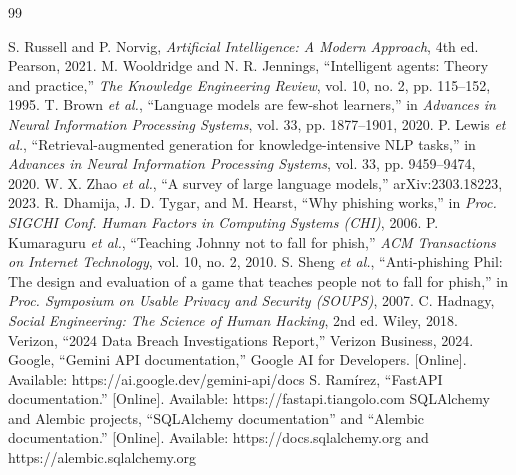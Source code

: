 \documentclass[conference,letterpaper]{IEEEtran}
\renewenvironment{thebibliography}[1]{%
  \begin{oldthebibliography}{#1}%
    \setlength{\itemsep}{0.5pt}%
    \setlength{\parskip}{0pt}%
}{%
  \end{oldthebibliography}%
}
\begin{document}
\begin{thebibliography}{99}
 S. Russell and P. Norvig, \textit{Artificial Intelligence: A Modern Approach}, 4th ed. Pearson, 2021.
 M. Wooldridge and N. R. Jennings, ``Intelligent agents: Theory and practice,'' \textit{The Knowledge Engineering Review}, vol. 10, no. 2, pp. 115--152, 1995.
 T. Brown \textit{et al.}, ``Language models are few-shot learners,'' in \textit{Advances in Neural Information Processing Systems}, vol. 33, pp. 1877--1901, 2020.
 P. Lewis \textit{et al.}, ``Retrieval-augmented generation for knowledge-intensive NLP tasks,'' in \textit{Advances in Neural Information Processing Systems}, vol. 33, pp. 9459--9474, 2020.
 W. X. Zhao \textit{et al.}, ``A survey of large language models,'' arXiv:2303.18223, 2023.
 R. Dhamija, J. D. Tygar, and M. Hearst, ``Why phishing works,'' in \textit{Proc. SIGCHI Conf. Human Factors in Computing Systems (CHI)}, 2006.
 P. Kumaraguru \textit{et al.}, ``Teaching Johnny not to fall for phish,'' \textit{ACM Transactions on Internet Technology}, vol. 10, no. 2, 2010.
 S. Sheng \textit{et al.}, ``Anti-phishing Phil: The design and evaluation of a game that teaches people not to fall for phish,'' in \textit{Proc. Symposium on Usable Privacy and Security (SOUPS)}, 2007.
 C. Hadnagy, \textit{Social Engineering: The Science of Human Hacking}, 2nd ed. Wiley, 2018.
 Verizon, ``2024 Data Breach Investigations Report,'' Verizon Business, 2024.
 Google, ``Gemini API documentation,'' Google AI for Developers. [Online]. Available: https://ai.google.dev/gemini-api/docs
 S. Ram\'irez, ``FastAPI documentation.'' [Online]. Available: https://fastapi.tiangolo.com
 SQLAlchemy and Alembic projects, ``SQLAlchemy documentation'' and ``Alembic documentation.'' [Online]. Available: https://docs.sqlalchemy.org and https://alembic.sqlalchemy.org
\end{thebibliography}
\end{document}
